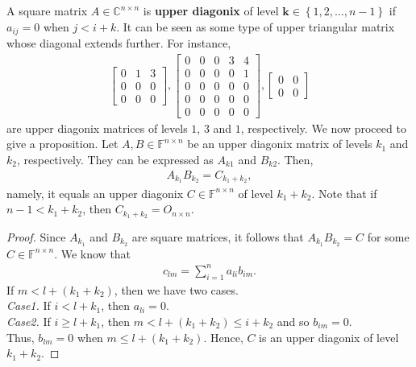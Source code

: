 \documentclass[12pt]{article}
\newenvironment{lemma}[2][Lemma]{\begin{trivlist} \item[\hskip \labelsep {\bfseries #1}\hskip \labelsep {\bfseries #2.}]}{\end{trivlist}}
\begin{document}
\begin{lemma}{Diagonix}
  A square matrix $A\in \mathbb{C}^{n\times n}$ is \textbf{upper diagonix} of level $\mathbf{k}\in \left\{1,2,\dots,n-1 \right\}$ if $a_{ij}=0$ when $j< i+k$. It can be seen as some type of upper triangular matrix whose diagonal extends further. For instance,
\begin{align*}
\begin{bmatrix}
  0 & 1 & 3 \\  0 & 0 & 0 \\ 0 & 0 & 0
\end{bmatrix},
\begin{bmatrix}
  0 & 0 & 0 & 3 & 4 \\ 0 & 0 & 0 & 0 & 1 \\ 
  0 & 0 & 0 & 0 & 0 \\ 0 & 0 & 0 & 0 & 0\\
  0 & 0 & 0 & 0 & 0
\end{bmatrix},
\begin{bmatrix}
  0 & 0 \\ 0 & 0 
\end{bmatrix}
\end{align*}
are upper diagonix matrices of levels $1$, $3$ and $1$, respectively. We now proceed to give a proposition. Let $A,B\in \mathbb{F}^{n\times n}$ be an upper diagonix matrix of levels $k_{1}$ and $k_{2}$, respectively. They can be expressed as $A_{k1}$ and $B_{k2}$. Then,
\begin{align*}
  A_{k_{1}}B_{k_{2}} = C_{k_{1}+k_{2}},
\end{align*}
namely, it equals an upper diagonix $C\in \mathbb{F}^{n\times n}$ of level $k_{1}+k_{2}$. Note that if $n-1<k_{1}+k_{2}$, then $C_{k_{1}+k_{2}} = O_{n\times n}$.
\begin{proof}
  Since $A_{k_{1}}$ and $B_{k_{2}}$ are square matrices, it follows that $A_{k_{1}}B_{k_{2}} = C$ for some $C\in \mathbb{F}^{n\times n}$. We know that
\begin{align*}
  c_{lm} = \sum_{i=1}^{n} a_{li}b_{im}.
\end{align*}
If $m < l+(k_{1}+k_{2})$, then we have two cases.\\
\textit{Case1.} If $i < l+k_{1}$, then $a_{li}=0$.\\
\textit{Case2.} If $i\geq l+k_{1}$, then $m<l+(k_{1}+k_{2})\leq i+k_{2}$  and so $b_{im} = 0$.\\
Thus, $b_{lm} = 0$ when $m\leq l+(k_{1}+k_{2})$. Hence, $C$ is an upper diagonix of level $k_{1}+k_{2}$.
\end{proof}
\end{lemma}
\end{document}
